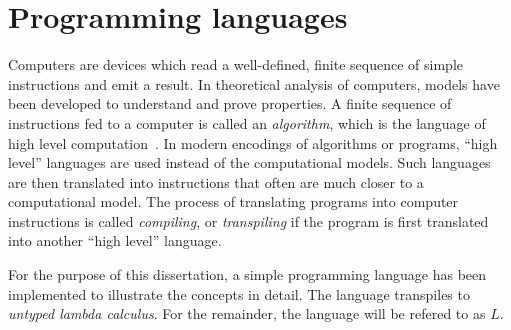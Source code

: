 \documentclass[11pt,oneside,a4paper]{report}
\begin{document}
\chapter{Programming languages}\label{sec:prog}
Computers are devices which read a well-defined, finite sequence of simple instructions and emit a result.
In theoretical analysis of computers, models have been developed to understand and prove properties.
A finite sequence of instructions fed to a computer is called an \textit{algorithm}, which is the language of high level computation~\cite{copeland1997church}.
In modern encodings of algorithms or programs, ``high level'' languages are used instead of the computational models.
Such languages are then translated into instructions that often are much closer to a computational model.
The process of translating programs into computer instructions is called \textit{compiling}, or \textit{transpiling} if the program is first translated into another ``high level'' language.

For the purpose of this dissertation, a simple programming language has been implemented to illustrate the concepts in detail.
The language transpiles to \textit{untyped lambda calculus}.
For the remainder, the language will be refered to as $L$.




\end{document}
